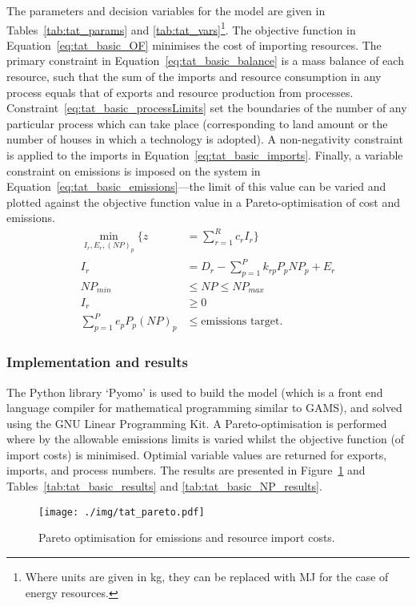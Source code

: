 The parameters and decision variables for the model are given in Tables~\ref{tab:tat_params} and \ref{tab:tat_vars}\footnote{Where units are given in kg, they can be replaced with MJ for the case of energy resources.}. The objective function in Equation~\eqref{eq:tat_basic_OF} minimises the cost of importing resources. The primary constraint in Equation~\eqref{eq:tat_basic_balance} is a mass balance of each resource, such that the sum of the imports and resource consumption in any process equals that of exports and resource production from processes. Constraint~\eqref{eq:tat_basic_processLimits} set the boundaries of the number of any particular process which can take place (corresponding to land amount or the number of houses in which a technology is adopted). A non-negativity constraint is applied to the imports in Equation~\eqref{eq:tat_basic_imports}. Finally, a variable constraint on emissions is imposed on the system in Equation~\eqref{eq:tat_basic_emissions}---the limit of this value can be varied and plotted against the objective function value in a Pareto-optimisation of cost and emissions.
\begin{align}
	\min_{I_r,E_r,(NP)_p} \Bigg\{z&=\sum_{r=1}^R c_rI_{r} \Bigg\} \label{eq:tat_basic_OF} \\
	I_r&=D_r-\sum_{p=1}^{P}k_{rp} P_p NP_p + E_r \label{eq:tat_basic_balance} \\
	NP_{min} &\leq NP \leq NP_{max} \label{eq:tat_basic_processLimits} \\			
	I_r &\geq 0 \label{eq:tat_basic_imports} \\
	\sum_{p=1}^P e_p P_p (NP)_p &\leq \mbox{emissions target} \label{eq:tat_basic_emissions}.
\end{align}
 
 

\subsubsection*{Implementation and results}
The Python library `Pyomo' is used to build the model (which is a front end language compiler for mathematical programming similar to GAMS), and solved using the GNU Linear Programming Kit. A Pareto-optimisation is performed where by the allowable emissions limits is varied whilst the objective function (of import costs) is minimised. Optimial variable values are returned for exports, imports, and process numbers. The results are presented in Figure~\ref{fig:tat_pareto} and Tables~\ref{tab:tat_basic_results} and \ref{tab:tat_basic_NP_results}.
\begin{figure}
	\centering
	\texttt{[image: ./img/tat\_pareto.pdf]}
	\caption{Pareto optimisation for emissions and resource import costs.} \label{fig:tat_pareto}
\end{figure}
 
 

